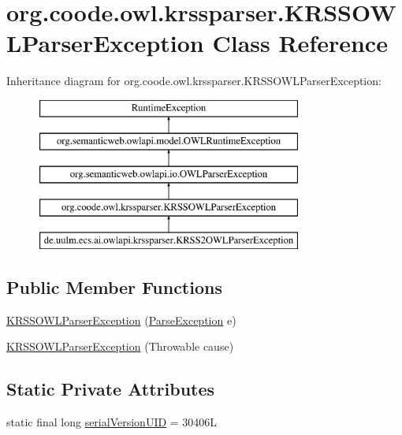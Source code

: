 \hypertarget{classorg_1_1coode_1_1owl_1_1krssparser_1_1_k_r_s_s_o_w_l_parser_exception}{\section{org.\-coode.\-owl.\-krssparser.\-K\-R\-S\-S\-O\-W\-L\-Parser\-Exception Class Reference}
\label{classorg_1_1coode_1_1owl_1_1krssparser_1_1_k_r_s_s_o_w_l_parser_exception}
}
Inheritance diagram for org.\-coode.\-owl.\-krssparser.\-K\-R\-S\-S\-O\-W\-L\-Parser\-Exception\-:\begin{figure}[H]
\begin{center}
\leavevmode
\includegraphics[height=5.000000cm]{classorg_1_1coode_1_1owl_1_1krssparser_1_1_k_r_s_s_o_w_l_parser_exception}
\end{center}
\end{figure}
\subsection*{Public Member Functions}
\begin{DoxyCompactItemize}
\item 
\hyperlink{classorg_1_1coode_1_1owl_1_1krssparser_1_1_k_r_s_s_o_w_l_parser_exception_a2b7c334c2368210baa139db00e042136}{K\-R\-S\-S\-O\-W\-L\-Parser\-Exception} (\hyperlink{classorg_1_1coode_1_1owl_1_1krssparser_1_1_parse_exception}{Parse\-Exception} e)
\item 
\hyperlink{classorg_1_1coode_1_1owl_1_1krssparser_1_1_k_r_s_s_o_w_l_parser_exception_aa7301957d76f911afe8758be6909774e}{K\-R\-S\-S\-O\-W\-L\-Parser\-Exception} (Throwable cause)
\end{DoxyCompactItemize}
\subsection*{Static Private Attributes}
\begin{DoxyCompactItemize}
\item 
static final long \hyperlink{classorg_1_1coode_1_1owl_1_1krssparser_1_1_k_r_s_s_o_w_l_parser_exception_ab9f4a9a86192fee52fda60e7b1e70642}{serial\-Version\-U\-I\-D} = 30406\-L
\end{DoxyCompactItemize}


